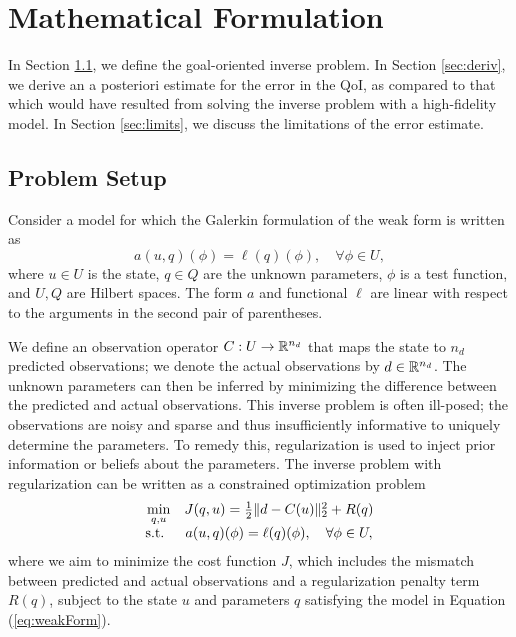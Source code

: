 \chapter{Mathematical Formulation} \label{chap:form}

In Section \ref{sec:setup}, we define the goal-oriented inverse problem. In Section \ref{sec:deriv}, we derive an a posteriori estimate for the error in the QoI, as compared to that which would have resulted from solving the inverse problem with a high-fidelity model. In Section \ref{sec:limits}, we discuss the limitations of the error estimate.

\section{Problem Setup}  \label{sec:setup}

Consider a model for which the Galerkin formulation of the weak form is written as
\begin{equation}
a(u,q)(\phi)=\ell(q)(\phi),\quad\forall\phi\in U,
\label{eq:weakForm}
\end{equation}
where $u\in U$ is the state, $q\in Q$ are the unknown parameters, $\phi$ is a test function, and $U,Q$ are Hilbert spaces. The form $a$ and functional $\ell$ are linear with respect to the arguments in the second pair of parentheses.

We define an observation operator $C:U\to{\mathbb{R}}^{n_d}$ that maps the state to $n_d$ predicted observations; we denote the actual observations by $d\in{\mathbb{R}}^{n_d}$. The unknown parameters can then be inferred by minimizing the difference between the predicted and actual observations. This inverse problem is often ill-posed; the observations are noisy and sparse and thus insufficiently informative to uniquely determine the parameters. To remedy this, regularization is used to inject prior information or beliefs about the parameters. The inverse problem with regularization can be written as a constrained optimization problem
\begin{equation}
\begin{array}{r@{}c}
\min\limits_{q,u} & \quad J(q,u)=\frac{1}{2}\|d-C(u)\|_2^2 + R(q) \\ \textrm{s.t. }& \quad a(u,q)(\phi)=\ell(q)(\phi),\quad\forall\phi\in U,
\end{array}
\label{eq:invOpt}
\end{equation}
where we aim to minimize the cost function $J$, which includes the mismatch between predicted and actual observations and a regularization penalty term $R(q)$, subject to the state $u$ and parameters $q$ satisfying the model in Equation (\ref{eq:weakForm}).

